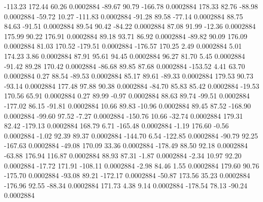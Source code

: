      -113.23      172.44       60.26     0.0002884
      -89.67       90.79     -166.78     0.0002884
      178.33       82.76      -88.98     0.0002884
      -59.72       10.27     -111.83     0.0002884
      -91.28       89.58      -77.14     0.0002884
       88.75       84.63      -91.51     0.0002884
       89.54       90.42      -84.22     0.0002884
       87.08       91.99      -12.36     0.0002884
      175.99       90.22      176.91     0.0002884
       89.18       93.71       86.92     0.0002884
      -89.82       90.09      176.09     0.0002884
       81.03      170.52     -179.51     0.0002884
     -176.57      170.25        2.49     0.0002884
        5.01      174.23        3.86     0.0002884
       87.91       95.61       94.45     0.0002884
       96.27       81.70        5.45     0.0002884
      -91.42       89.28      170.42     0.0002884
      -86.68       89.85       87.68     0.0002884
     -153.52        4.41       63.70     0.0002884
        0.27       88.54      -89.53     0.0002884
       85.17       89.61      -89.33     0.0002884
      179.53       90.73      -93.14     0.0002884
      177.48       97.88       90.38     0.0002884
      -84.70       85.83       85.42     0.0002884
      -19.53      170.56       65.91     0.0002884
        0.27       89.99       -0.97     0.0002884
       88.63       89.74      -99.51     0.0002884
     -177.02       86.15      -91.81     0.0002884
       10.66       89.83      -10.96     0.0002884
       89.45       87.52     -168.90     0.0002884
      -99.60       97.52       -7.27     0.0002884
     -150.76       10.66      -32.74     0.0002884
      179.31       82.42     -179.13     0.0002884
      168.79        6.71     -165.48     0.0002884
       -1.19      176.60       -0.56     0.0002884
       -1.02       92.39       89.37     0.0002884
     -144.70        6.54     -122.85     0.0002884
      -90.79       92.25     -167.63     0.0002884
      -49.08      170.09       33.36     0.0002884
     -178.49       88.50       92.18     0.0002884
      -63.88      176.94      116.87     0.0002884
       88.93       87.31       -1.87     0.0002884
       -2.34       10.97       92.20     0.0002884
      -17.72      171.91     -108.11     0.0002884
       -2.98       84.46        1.55     0.0002884
      179.60       90.76     -175.70     0.0002884
      -93.08       89.21     -172.17     0.0002884
      -50.87      173.56       35.23     0.0002884
     -176.96       92.55      -88.34     0.0002884
      171.73        4.38        9.14     0.0002884
     -178.54       78.13      -90.24     0.0002884
